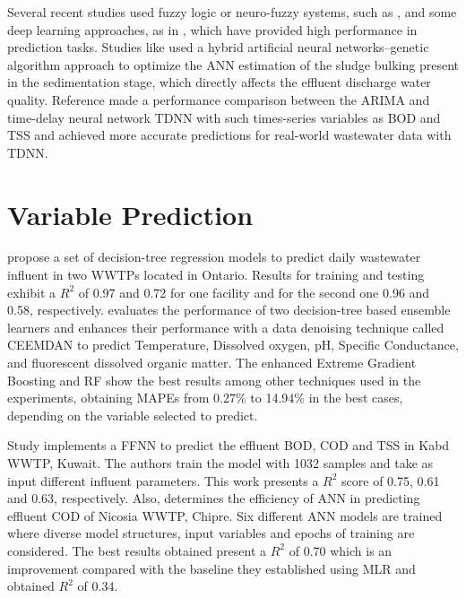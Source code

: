 Several recent studies used fuzzy logic or neuro-fuzzy systems, such as \cite{Nourani2018,Nadiri2018,Han2018}, and some deep learning approaches, as in \cite{Guo2015,Alsina2018,Dairi2019}, which have provided high performance in prediction tasks. Studies like \cite{Bagheri2015} used a hybrid artificial neural networks–genetic algorithm approach to optimize the \ac{ANN} estimation of the sludge bulking present in the sedimentation stage, which directly affects the effluent discharge water quality. Reference \cite{Dellana2009} made a performance comparison between the \ac{ARIMA} and time-delay neural network \ac{TDNN} with such times-series variables as \ac{BOD} and \ac{TSS} and achieved more accurate predictions for real-world wastewater data with \ac{TDNN}.

\section{Variable Prediction}
\label{s:RelatedWorks-variablePrediction}

\cite{Zhou2019} propose a set of decision-tree regression models to predict daily wastewater influent in two \ac{WWTP}s located in Ontario. Results for training and testing exhibit a \begin{math}R^2\end{math} of 0.97 and 0.72 for one facility and for the second one 0.96 and 0.58, respectively. \cite{Lu2020} evaluates the performance of two decision-tree based ensemble learners and enhances their performance with a data denoising technique called \ac{CEEMDAN} to predict Temperature, Dissolved oxygen, pH, Specific Conductance, and fluorescent dissolved organic matter. The enhanced Extreme Gradient Boosting and \ac{RF} show the best results among other techniques used in the experiments, obtaining \ac{MAPE}s from 0.27\% to 14.94\% in the best cases, depending on the variable selected to predict.

Study \cite{Alsulaili2021} implements a \ac{FFNN} to predict the effluent \ac{BOD}, \ac{COD} and \ac{TSS} in Kabd \ac{WWTP}, Kuwait. The authors train the model with 1032 samples and take as input different influent parameters. This work presents a \begin{math}R^2\end{math} score of 0.75, 0.61 and 0.63, respectively. Also, \cite{Abba2017} determines the efficiency of \ac{ANN} in predicting effluent \ac{COD} of Nicosia \ac{WWTP}, Chipre. Six different \ac{ANN} models are trained where diverse model structures, input variables and epochs of training are considered. The best results obtained present a \begin{math}R^2\end{math} of 0.70 which is an improvement compared with the baseline they established using \ac{MLR} and obtained \begin{math}R^2\end{math} of 0.34.

